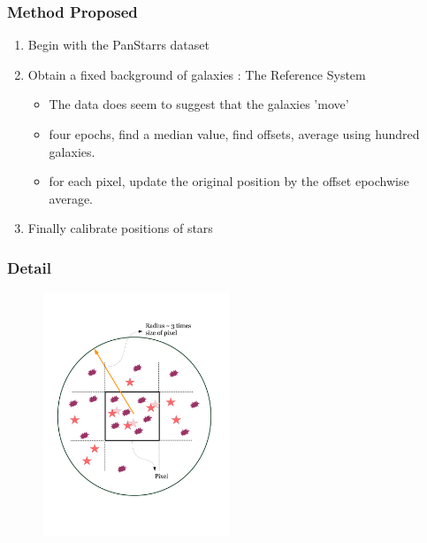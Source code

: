 \documentclass[10pt, compress]{beamer}
\begin{document}
\begin{frame}
\frametitle{Method Proposed}
	\begin{enumerate}
		\item Begin with the PanStarrs dataset
        \item Obtain a fixed background of galaxies : The Reference System
        	\begin{itemize}
				\item The data does seem to suggest that the galaxies 'move'
                \item four epochs, find a median value, find offsets, average using hundred galaxies.
                \item for each pixel, update the original position by the offset epochwise average.
               \end{itemize}
        \item Finally calibrate positions of stars
        
	\end{enumerate}
\end{frame}


\begin{frame}
\frametitle{Detail}
\begin{figure}\centering
\includegraphics[width=0.5\textwidth]{pixelRadiusStarGalaxy.jpg}
\end{figure}

\end{frame}
\end{document}
